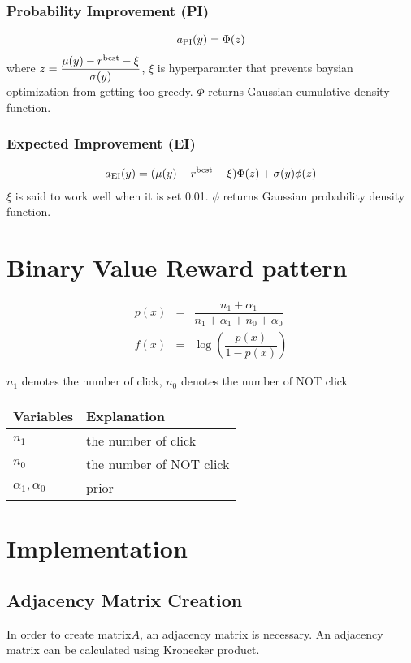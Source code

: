\documentclass[platex, a4paper]{jsarticle}
\begin{document}
\subsubsection{Probability Improvement (PI)}
\begin{eqnarray}
a_{\rm PI}(y) = \Phi(z)
\end{eqnarray}
where $z=\dfrac{\mu(y)-r^{\rm best}-\xi}{\sigma(y)}$, $\xi$ is hyperparamter that prevents baysian optimization from getting too greedy. $\Phi$ returns Gaussian cumulative density function.

\subsubsection{Expected Improvement (EI)}
\begin{eqnarray}
a_{\rm EI}(y) = (\mu(y)-r^{\rm best}-\xi)\Phi(z) + \sigma(y)\phi(z)
\end{eqnarray}
$\xi$ is said to work well when it is set 0.01. $\phi$ returns Gaussian probability density function.


\section{Binary Value Reward pattern}
\begin{eqnarray}
  p(x) &=& \dfrac{n_1 + \alpha_1} {n_1 + \alpha_1 + n_0 + \alpha_0} \\
  f(x) &=& \log \left(\dfrac{p(x)}{1-p(x)} \right)
\end{eqnarray}

$n_1$ denotes the number of click, $n_0$ denotes the number of NOT click

\begin{table}[htb]
\begin{tabular}{ll} \toprule
Variables & Explanation \\ \toprule
$n_1$ & the number of click\\
$n_0$ & the number of NOT click \\
$\alpha_1, \alpha_0$ & prior\\
\bottomrule
\end{tabular}
\end{table}

\section{Implementation}
\subsection{Adjacency Matrix Creation}
In order to create matrix$A$, an adjacency matrix is necessary.
An adjacency matrix can be calculated using Kronecker product.
\end{document}
